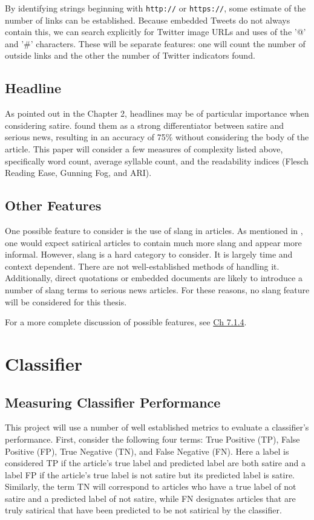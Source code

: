 \documentclass [12 pt] {report}
\begin{document}
By identifying strings beginning with \texttt{http://} or \texttt{https://}, some estimate of the number of links can be established. Because embedded Tweets do not always contain this, we can search explicitly for Twitter image URLs and uses of the '@' and '\#' characters. These will be separate features: one will count the number of outside links and the other the number of Twitter indicators found.

\subsection{Headline}
As pointed out in the Chapter 2, headlines may be of particular importance when considering satire. \cite{Horne} found them as a strong differentiator between satire and serious news, resulting in an accuracy of 75\% without considering the body of the article. This paper will consider a few measures of complexity listed above, specifically word count, average syllable count, and the readability indices (Flesch Reading Ease, Gunning Fog, and ARI).

\subsection{Other Features}
One possible feature to consider is the use of slang in articles. As mentioned in \cite{Burfoot}, one would expect satirical articles to contain much more slang and appear more informal. However, slang is a hard category to consider. It is largely time and context dependent. There are not well-established methods of handling it. Additionally, direct quotations or embedded documents are likely to introduce a number of slang terms to serious news articles. For these reasons, no slang feature will be considered for this thesis.

For a more complete discussion of possible features, see \hyperref[Other Features]{Ch 7.1.4}.

\section{Classifier} \label{Classifier}
\subsection*{Measuring Classifier Performance}
This project will use a number of well established metrics to evaluate a classifier's performance. First, consider the following four terms: True Positive (TP), False Positive (FP), True Negative (TN), and False Negative (FN). Here a label is considered TP if the article's true label and predicted label are both satire and a label FP if the article's true label is not satire but its predicted label is satire. Similarly, the term TN will correspond to articles who have a true label of not satire and a predicted label of not satire, while FN designates articles that are truly satirical that have been predicted to be not satirical by the classifier.
\end{document}
